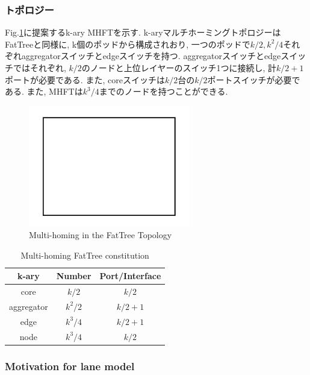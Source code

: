 \subsubsection{トポロジー}
Fig.\ref{fig:multi-homing}に提案するk-ary MHFTを示す. 
k-aryマルチホーミングトポロジーはFatTreeと同様に, k個のポッドから構成されおり, 
一つのポッドで$k/2, k^2/4$それぞれaggregatorスイッチとedgeスイッチを持つ. 
aggregatorスイッチとedgeスイッチではそれぞれ,
$k/2$のノードと上位レイヤーのスイッチ1つに接続し, 計$k/2+1$ポートが必要である. 
また, coreスイッチは$k/2$台の$k/2$ポートスイッチが必要である. 
また, MHFTは$k^3/4$までのノードを持つことができる. 

\begin{figure}[t]
    \begin{center}
    \includegraphics[autoebb, width=200pt]{./img/test.pdf}
    \caption{Multi-homing in the FatTree Topology}
    \label{fig:multi-homing}
    \end{center}
\end{figure}

\begin{table}[t]
    \begin{center}
    \begin{tabular}{|c|c|c|}
    \hline
    k-ary & Number & Port/Interface \\ \hline \hline
    core & $k/2$ & $k/2$ \\ \hline
    aggregator & $k^2/2$ & $k / 2 + 1$ \\ \hline
    edge & $k^3 / 4$ & $k / 2 + 1$ \\ \hline
    node & $k^3 / 4$ & $k / 2$ \\
    \hline
    \end{tabular}
    \caption{Multi-homing FatTree constitution}
    \label{table:mhft_constitution}
    \end{center}
\end{table}

\subsubsection{Motivation for lane model}

